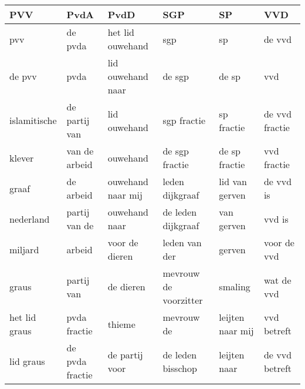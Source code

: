 \begin{tabular}{llllll}
\toprule
           PVV &             PvdA &               PvdD &                    SGP &                SP &             VVD \\
\midrule
           pvv &          de pvda &   het lid ouwehand &                    sgp &                sp &          de vvd \\
        de pvv &             pvda &  lid ouwehand naar &                 de sgp &             de sp &             vvd \\
  islamitische &    de partij van &       lid ouwehand &            sgp fractie &        sp fractie &  de vvd fractie \\
        klever &    van de arbeid &           ouwehand &         de sgp fractie &     de sp fractie &     vvd fractie \\
         graaf &        de arbeid &  ouwehand naar mij &        leden dijkgraaf &    lid van gerven &       de vvd is \\
     nederland &    partij van de &      ouwehand naar &     de leden dijkgraaf &        van gerven &          vvd is \\
       miljard &           arbeid &     voor de dieren &          leden van der &            gerven &     voor de vvd \\
         graus &       partij van &          de dieren &  mevrouw de voorzitter &           smaling &      wat de vvd \\
 het lid graus &     pvda fractie &             thieme &             mevrouw de &  leijten naar mij &     vvd betreft \\
     lid graus &  de pvda fractie &     de partij voor &      de leden bisschop &      leijten naar &  de vvd betreft \\
\bottomrule
\end{tabular}
